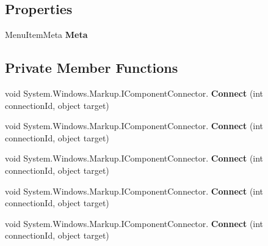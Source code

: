 \subsection*{Properties}
\begin{DoxyCompactItemize}
\item 
Menu\+Item\+Meta {\bfseries Meta}
\end{DoxyCompactItemize}
\subsection*{Private Member Functions}
\begin{DoxyCompactItemize}
\item 
\mbox{\label{class_teacher_handbook_1_1_plugins_1_1_schedule_1_1_schedule_a6b69e488632bb6650e94e68de0137da0}} 
void System.\+Windows.\+Markup.\+I\+Component\+Connector. {\bfseries Connect} (int connection\+Id, object target)
\item 
\mbox{\label{class_teacher_handbook_1_1_plugins_1_1_schedule_1_1_schedule_a6b69e488632bb6650e94e68de0137da0}} 
void System.\+Windows.\+Markup.\+I\+Component\+Connector. {\bfseries Connect} (int connection\+Id, object target)
\item 
\mbox{\label{class_teacher_handbook_1_1_plugins_1_1_schedule_1_1_schedule_a6b69e488632bb6650e94e68de0137da0}} 
void System.\+Windows.\+Markup.\+I\+Component\+Connector. {\bfseries Connect} (int connection\+Id, object target)
\item 
\mbox{\label{class_teacher_handbook_1_1_plugins_1_1_schedule_1_1_schedule_a6b69e488632bb6650e94e68de0137da0}} 
void System.\+Windows.\+Markup.\+I\+Component\+Connector. {\bfseries Connect} (int connection\+Id, object target)
\item 
\mbox{\label{class_teacher_handbook_1_1_plugins_1_1_schedule_1_1_schedule_a6b69e488632bb6650e94e68de0137da0}} 
void System.\+Windows.\+Markup.\+I\+Component\+Connector. {\bfseries Connect} (int connection\+Id, object target)
\end{DoxyCompactItemize}
